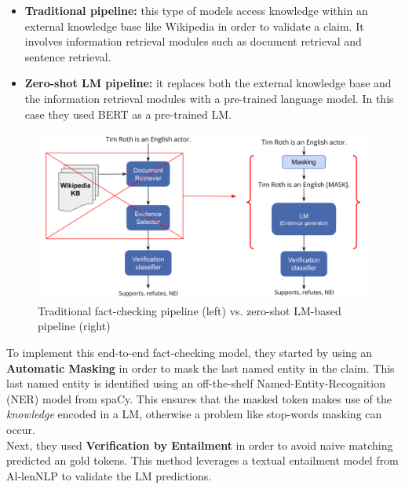 \documentclass[10pt, english]{report}
\begin{document}
\begin{itemize}
\item \textbf{Traditional pipeline:} this type of models access knowledge within an external knowledge base like Wikipedia in order to validate a claim. It involves information retrieval modules such as document retrieval and sentence retrieval.
\item \textbf{Zero-shot LM pipeline:} it replaces both the external knowledge base and the information retrieval modules with a pre-trained language model. In this case they used BERT as a pre-trained LM.
\end{itemize}

\begin{figure}[H]
	\centering
	\includegraphics[scale=0.35]{img/tradition_and_zero_shot_lm.png}
	\caption{Traditional fact-checking pipeline (left) vs. zero-shot LM-based pipeline (right) \cite{lee2020language}}
\end{figure}

To implement this end-to-end fact-checking model, they started by using an \textbf{Automatic Masking} in order to mask the last named entity in the claim. This last named entity is identified using an off-the-shelf Named-Entity-Recognition (NER) model from spaCy. This ensures that the masked token makes use of the \textit{knowledge} encoded in a LM, otherwise a problem like stop-words masking can occur.\\
Next, they used \textbf{Verification by Entailment} in order to avoid naive matching predicted an gold tokens. This method leverages a textual entailment model from Al-lenNLP to validate the LM predictions.\\
\end{document}
